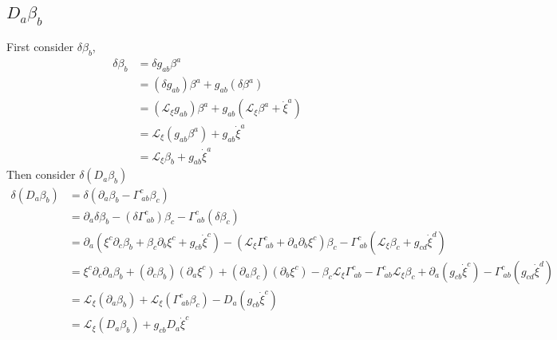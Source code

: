 \documentclass{article}
\begin{document}
\subsection{$D_{a}\beta_{b}$}
First consider $\delta \beta_{b}$, 
\begin{align*}
\delta \beta_{b} & = \delta g_{ab}\beta^{a}\\
& = (\delta g_{ab})\beta^{a} + g_{ab}(\delta \beta^{a})\\
& = (\mathcal{L}_{\xi}g_{ab})\beta^{a} + g_{ab}(\mathcal{L}_{\xi}\beta^{a} + {\dot \xi}^{a})\\
& = \mathcal{L}_{\xi}(g_{ab}\beta^{a}) + g_{ab}{\dot \xi}^{a}\\
& = \mathcal{L}_{\xi}\beta_{b} + g_{ab}{\dot \xi}^{a}
\end{align*}
Then consider $\delta (D_{a}\beta_{b})$
\begin{align*}
\delta (D_{a}\beta_{b}) & = \delta(\partial_{a}\beta_{b} - \Gamma^{c}_{~ab}\beta_{c})\\
& = \partial_{a}\delta\beta_{b} - (\delta \Gamma^{c}_{~ab})\beta_{c} - \Gamma^{c}_{~ab}(\delta\beta_{c})\\
& = \partial_{a}(\xi^{c}\partial_{c}\beta_{b} + \beta_{c}\partial_{b}\xi^{c} + g_{cb}{\dot \xi}^{c}) - (\mathcal{L}_{\xi}\Gamma^{c}_{~ab} + \partial_{a}\partial_{b}\xi^{c})\beta_{c} - \Gamma^{c}_{~ab}(\mathcal{L}_{\xi}\beta_{c} + g_{cd}{\dot \xi}^{d})\\
& = \xi^{c}\partial_{c}\partial_{a}\beta_{b} + (\partial_{c}\beta_{b})(\partial_{a}\xi^{c}) + (\partial_{a}\beta_{c})(\partial_{b}\xi^{c}) - \beta_{c}\mathcal{L}_{\xi}\Gamma^{c}_{~ab} - \Gamma^{c}_{~ab}\mathcal{L}_{\xi}\beta_{c} + \partial_{a}(g_{cb}{\dot \xi}^{c}) - \Gamma^{c}_{~ab}(g_{cd}{\dot \xi}^{d})\\
& = \mathcal{L}_{\xi}(\partial_{a}\beta_{b}) + \mathcal{L}_{\xi}(\Gamma^{c}_{~ab}\beta_{c}) - D_{a}(g_{cb}{\dot \xi}^{c})\\
& = \mathcal{L}_{\xi}(D_{a}\beta_{b}) + g_{cb}D_{a}{\dot \xi}^{c}
\end{align*}
\end{document}
